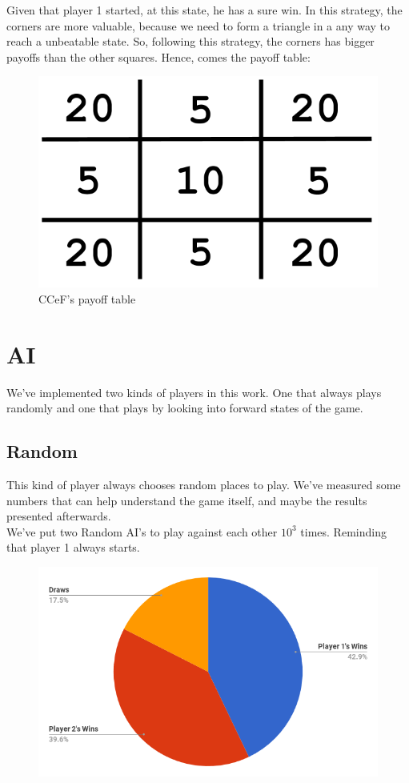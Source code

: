 \documentclass[10pt]{article}
\begin{document}
Given that player 1 started, at this state, he has a sure win. In this strategy, the corners are more valuable, because we need to form a triangle in a any way to reach a unbeatable state. So, following this strategy, the corners has bigger payoffs than the other squares. Hence, comes the payoff table:

\begin{figure}[H]
\centering
\includegraphics[scale=0.2]{img/ptable2.png}
\caption{CCeF's payoff table}
\end{figure}


\section{AI}

We've implemented two kinds of players in this work. One that always plays randomly and one that plays by looking into forward states of the game.

\subsection{Random}
This kind of player always chooses random places to play. We've measured some numbers that can help understand the game itself, and maybe the results presented afterwards.\\

We've put two Random AI's to play against each other $10^3$ times. Reminding that player 1 always starts.

\begin{figure}[H]
\centering
\includegraphics[scale=0.4]{img/random-chart.png}
\end{figure}
\end{document}
